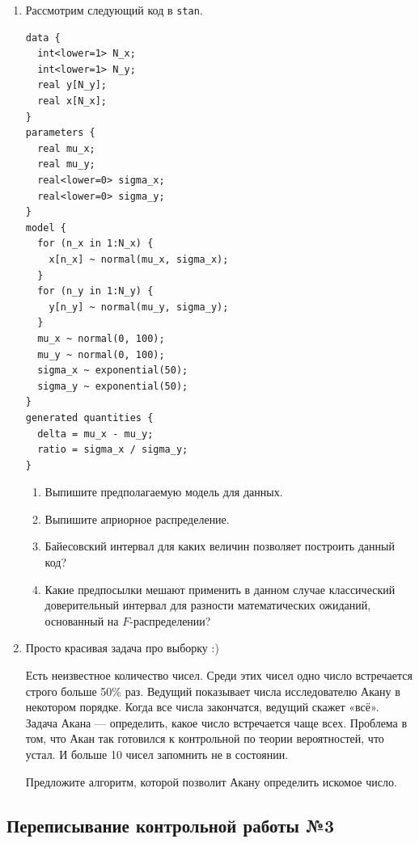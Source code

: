 \documentclass[12pt, a4paper]{article}\usepackage[]{graphicx}\usepackage[]{color}
\begin{document}
\begin{enumerate}
\newpage
\item Рассмотрим следующий код в \verb|stan|.

\begin{verbatim}
data {
  int<lower=1> N_x;
  int<lower=1> N_y;
  real y[N_y];
  real x[N_x];
}
parameters {
  real mu_x;
  real mu_y;
  real<lower=0> sigma_x;
  real<lower=0> sigma_y;
}
model {
  for (n_x in 1:N_x) {
    x[n_x] ~ normal(mu_x, sigma_x);
  }
  for (n_y in 1:N_y) {
    y[n_y] ~ normal(mu_y, sigma_y);
  }
  mu_x ~ normal(0, 100);
  mu_y ~ normal(0, 100);
  sigma_x ~ exponential(50);
  sigma_y ~ exponential(50);
}
generated quantities {
  delta = mu_x - mu_y;
  ratio = sigma_x / sigma_y;
}
\end{verbatim}

\begin{enumerate}
\item Выпишите предполагаемую модель для данных.
\item Выпишите априорное распределение.
\item Байесовский интервал для каких величин позволяет построить данный код?
\item Какие предпосылки мешают применить в данном случае классический доверительный интервал для разности математических ожиданий, основанный на $F$-распределении?
\end{enumerate}

\item Просто красивая задача про выборку :)

Есть неизвестное количество чисел. Среди этих чисел одно число встречается строго больше 50\% раз. Ведущий показывает числа исследователю Акану в некотором порядке. Когда все числа закончатся, ведущий скажет «всё». Задача Акана — определить, какое число встречается чаще всех. Проблема в том, что Акан так готовился к контрольной по теории вероятностей, что устал. И больше 10 чисел запомнить не в состоянии.

Предложите алгоритм, которой позволит Акану определить искомое число.

\end{enumerate}

\subsection{Переписывание контрольной работы №3}
\end{document}
